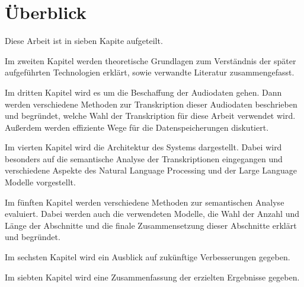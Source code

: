 \section{Überblick}

Diese Arbeit ist in sieben Kapite aufgeteilt.

Im zweiten Kapitel werden theoretische Grundlagen zum Verständnis der später aufgeführten Technologien erklärt, sowie verwandte Literatur zusammengefasst.

Im dritten Kapitel wird es um die Beschaffung der Audiodaten gehen. 
Dann werden verschiedene Methoden zur Transkription dieser Audiodaten beschrieben und begründet, welche Wahl der Transkription für diese Arbeit verwendet wird.
Außerdem werden effiziente Wege für die Datenspeicherungen diskutiert.

Im vierten Kapitel wird die Architektur des Systems dargestellt. 
Dabei wird besonders auf die semantische Analyse der Transkriptionen eingegangen und verschiedene Aspekte des Natural Language Processing und der Large Language Modelle vorgestellt.

Im fünften Kapitel werden verschiedene Methoden zur semantischen Analyse evaluiert.
Dabei werden auch die verwendeten Modelle, die Wahl der Anzahl und Länge der Abschnitte und die finale Zusammensetzung dieser Abschnitte erklärt und begründet.

Im sechsten Kapitel wird ein Ausblick auf zukünftige Verbesserungen gegeben.

Im siebten Kapitel wird eine Zusammenfassung der erzielten Ergebnisse gegeben.

